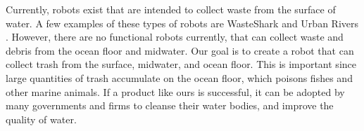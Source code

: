 Currently, robots exist that are intended to collect waste from the surface of water. A few examples of these types of robots are WasteShark \cite{global} and Urban Rivers \cite{asme}. However, there are no functional robots currently, that can collect waste and debris from the ocean floor and midwater. Our goal is to create a robot that can collect trash from the surface, midwater, and ocean floor. This is important since large quantities of trash accumulate on the ocean floor, which poisons fishes and other marine animals. If a product like ours is successful, it can be adopted by many governments and firms to cleanse their water bodies, and improve the quality of water. 